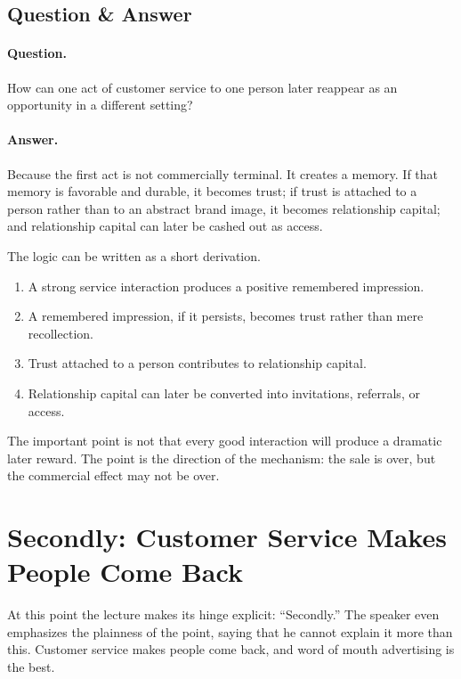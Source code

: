 \subsection{Question \& Answer}

\paragraph{Question.} How can one act of customer service to one person later reappear as an opportunity in a different setting?

\paragraph{Answer.} Because the first act is not commercially terminal. It creates a memory. If that memory is favorable and durable, it becomes trust; if trust is attached to a person rather than to an abstract brand image, it becomes relationship capital; and relationship capital can later be cashed out as access.

The logic can be written as a short derivation.

\begin{enumerate}
\item A strong service interaction produces a positive remembered impression.
\item A remembered impression, if it persists, becomes trust rather than mere recollection.
\item Trust attached to a person contributes to relationship capital.
\item Relationship capital can later be converted into invitations, referrals, or access.
\end{enumerate}

The important point is not that every good interaction will produce a dramatic later reward. The point is the direction of the mechanism: the sale is over, but the commercial effect may not be over.

\section{Secondly: Customer Service Makes People Come Back}

At this point the lecture makes its hinge explicit: ``Secondly.'' The speaker even emphasizes the plainness of the point, saying that he cannot explain it more than this. Customer service makes people come back, and word of mouth advertising is the best.

